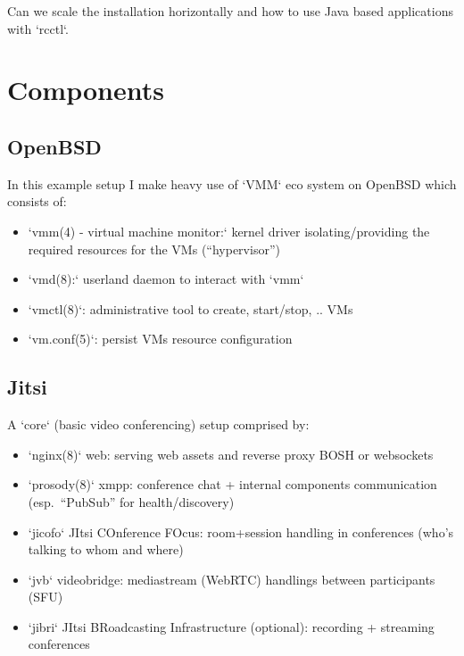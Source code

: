\documentclass[conference]{IEEEtran}
\begin{document}
Can we scale the installation horizontally and how to use Java based applications
with `rcctl`.
\section{Components}
\subsection{OpenBSD}
In this example setup I make heavy use of `VMM` eco system on OpenBSD which consists of:
\begin{itemize}
\item `vmm(4) - virtual machine monitor:`
    kernel driver isolating/providing the required resources for the VMs (“hypervisor”)
\item `vmd(8):`
	userland daemon to interact with `vmm`
\item `vmctl(8)`:
	administrative tool to create, start/stop, .. VMs
\item `vm.conf(5)`:
	persist VMs resource configuration
\end{itemize}
\subsection{Jitsi}
A `core` (basic video conferencing) setup comprised by:
\begin{itemize}
\item `nginx(8)` web:
	serving web assets and reverse proxy BOSH or websockets
\item `prosody(8)` xmpp:
	conference chat + internal components communication (esp. “PubSub” for health/discovery)
\item `jicofo` JItsi COnference FOcus:
	room+session handling in conferences (who’s talking to whom and where)
\item `jvb` videobridge:
	mediastream (WebRTC) handlings between participants (SFU)
\item `jibri` JItsi BRoadcasting Infrastructure (optional):
	recording + streaming conferences
\end{itemize}
\end{document}
